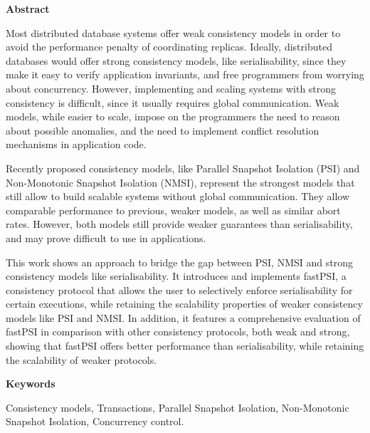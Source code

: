 \newpage

\begin{center}
{\bf \Huge Abstract}
\end{center}

\vspace{1cm}

Most distributed database systems offer weak consistency models in order to avoid
the performance penalty of coordinating replicas. Ideally, distributed databases
would offer strong consistency models, like serialisability, since they make it
easy to verify application invariants, and free programmers from worrying about
concurrency. However, implementing and scaling systems with strong consistency
is difficult, since it usually requires global communication. Weak models, while
easier to scale, impose on the programmers the need to reason about possible
anomalies, and the need to implement conflict resolution mechanisms in application
code.

Recently proposed consistency models, like Parallel Snapshot Isolation (PSI) and
Non-Monotonic Snapshot Isolation (NMSI), represent the strongest models that still
allow to build scalable systems without global communication. They allow comparable
performance to previous, weaker models, as well as similar abort rates. However, both
models still provide weaker guarantees than serialisability, and may prove difficult
to use in applications.

This work shows an approach to bridge the gap between PSI, NMSI and strong
consistency models like serialisability. It introduces and implements fastPSI, a
consistency protocol that allows the user to selectively enforce serialisability
for certain executions, while retaining the scalability properties of weaker
consistency models like PSI and NMSI. In addition, it features a comprehensive
evaluation of fastPSI in comparison with other consistency protocols, both weak
and strong, showing that fastPSI offers better performance than serialisability,
while retaining the scalability of weaker protocols.

\vspace{1cm}

\begin{center}
{\bf \Large Keywords}
\end{center}

\vspace{0.5cm}

Consistency models, Transactions, Parallel Snapshot Isolation, Non-Monotonic
Snapshot Isolation, Concurrency control.
